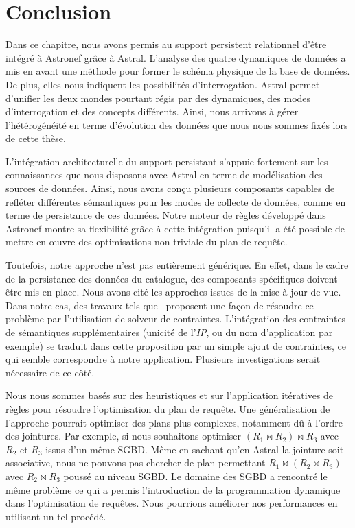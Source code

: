 \section{Conclusion}\label{sec:contrib:asteroid:conclusion}
Dans ce chapitre, nous avons permis au support persistent relationnel d'être intégré à Astronef grâce à Astral. L'analyse des quatre dynamiques de données a mis en avant une méthode pour former le schéma physique de la base de données. De plus, elles nous indiquent les possibilités d'interrogation. Astral permet d'unifier les deux mondes pourtant régis par des dynamiques, des modes d'interrogation et des concepts différents. Ainsi, nous arrivons à gérer l'hétérogénéité en terme d'évolution des données que nous nous sommes fixés lors de cette thèse.

L'intégration architecturelle du support persistant s'appuie fortement sur les connaissances que nous disposons avec Astral en terme de modélisation des sources de données. Ainsi, nous avons conçu plusieurs composants capables de refléter différentes sémantiques pour les modes de collecte de données, comme en terme de persistance de ces données. Notre moteur de règles développé dans Astronef montre sa flexibilité grâce à cette intégration puisqu'il a été possible de mettre en œuvre des optimisations non-triviale du plan de requête.

Toutefois, notre approche n'est pas entièrement générique. En effet, dans le cadre de la persistance des données du catalogue, des composants spécifiques doivent être mis en place. Nous avons cité les approches issues de la mise à jour de vue. Dans notre cas, des travaux tels que~\cite{Shu:viewupdate} proposent une façon de résoudre ce problème par l'utilisation de solveur de contraintes. L'intégration des contraintes de sémantiques supplémentaires (unicité de l'\textit{IP}, ou du nom d'application par exemple) se traduit dans cette proposition par un simple ajout de contraintes, ce qui semble correspondre à notre application. Plusieurs investigations serait nécessaire de ce côté.

Nous nous sommes basés sur des heuristiques et sur l'application itératives de règles pour résoudre l'optimisation du plan de requête. Une généralisation de l'approche pourrait optimiser des plans plus complexes, notamment dû à l'ordre des jointures. Par exemple, si nous souhaitons optimiser $(R_1 \Join R_2) \Join R_3$ avec $R_2$ et $R_3$ issus d'un même SGBD. Même en sachant qu'en Astral la jointure soit associative, nous ne pouvons pas chercher de plan permettant $R_1 \Join (R_2 \Join R_3)$ avec $R_2\Join R_3$ poussé au niveau SGBD. Le domaine des SGBD a rencontré le même problème ce qui a permis l'introduction de la programmation dynamique dans l'optimisation de requêtes. Nous pourrions améliorer nos performances en utilisant un tel procédé.